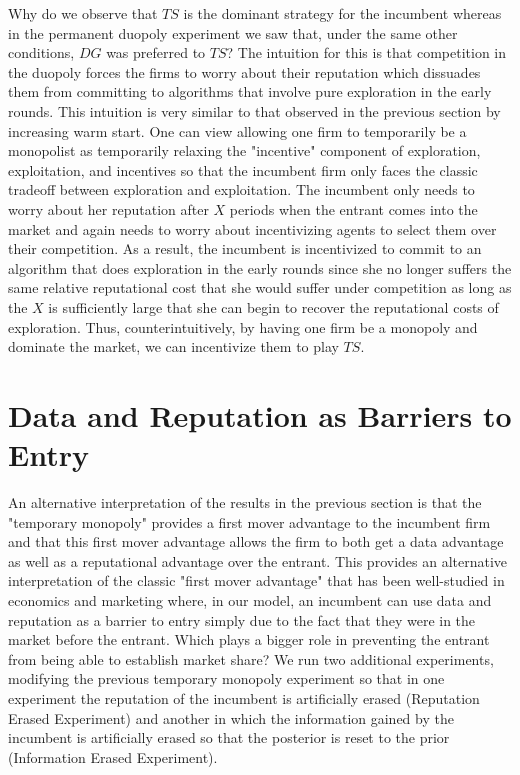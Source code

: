 \documentclass{article}
\theoremstyle{definition}
\begin{document}
Why do we observe that $TS$ is the dominant strategy for the incumbent whereas in the permanent duopoly experiment we saw that, under the same other conditions, $DG$ was preferred to $TS$? The intuition for this is that competition in the duopoly forces the firms to worry about their reputation which dissuades them from committing to algorithms that involve pure exploration in the early rounds. This intuition is very similar to that observed in the previous section by increasing warm start. One can view allowing one firm to temporarily be a monopolist as temporarily relaxing the "incentive" component of exploration, exploitation, and incentives so that the incumbent firm only faces the classic tradeoff between exploration and exploitation. The incumbent only needs to worry about her reputation after $X$ periods when the entrant comes into the market and again needs to worry about incentivizing agents to select them over their competition. As a result, the incumbent is incentivized to commit to an algorithm that does exploration in the early rounds since she no longer suffers the same relative reputational cost that she would suffer under competition as long as the $X$ is sufficiently large that she can begin to recover the reputational costs of exploration. Thus, counterintuitively, by having one firm be a monopoly and dominate the market, we can incentivize them to play $TS$.

\section{Data and Reputation as Barriers to Entry}\label{section:6}

An alternative interpretation of the results in the previous section is that the "temporary monopoly" provides a first mover advantage to the incumbent firm and that this first mover advantage allows the firm to both get a data advantage as well as a reputational advantage over the entrant. This provides an alternative interpretation of the classic "first mover advantage" that has been well-studied in economics and marketing \citep*{kerin1992first} where, in our model, an incumbent can use data and reputation as a barrier to entry simply due to the fact that they were in the market before the entrant. Which plays a bigger role in preventing the entrant from being able to establish market share? We run two additional experiments, modifying the previous temporary monopoly experiment so that in one experiment the reputation of the incumbent is artificially erased (Reputation Erased Experiment) and another in which the information gained by the incumbent is artificially erased so that the posterior is reset to the prior (Information Erased Experiment).
\end{document}
